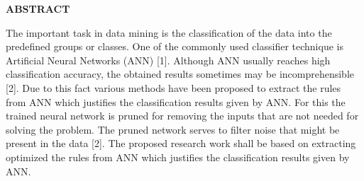 \begin{titlepage}
\begin{center}
\huge{\bf{ABSTRACT\\}}\end{center}
\large{
The important task in data mining is the classification of the data into the predefined groups or classes. One of the commonly used classifier technique is Artificial Neural Networks (ANN) [1]. Although ANN usually reaches high classification accuracy, the obtained results sometimes may be incomprehensible [2]. Due to this fact various methods have been proposed to extract the rules from ANN which justifies the classification results given by ANN. For this the trained neural network is pruned for removing the inputs that are not needed for solving the problem. The pruned network serves to filter noise that might be present in the data [2]. The proposed research work shall be based on extracting optimized the rules from ANN which justifies the classification results given by ANN.}
\end{titlepage}